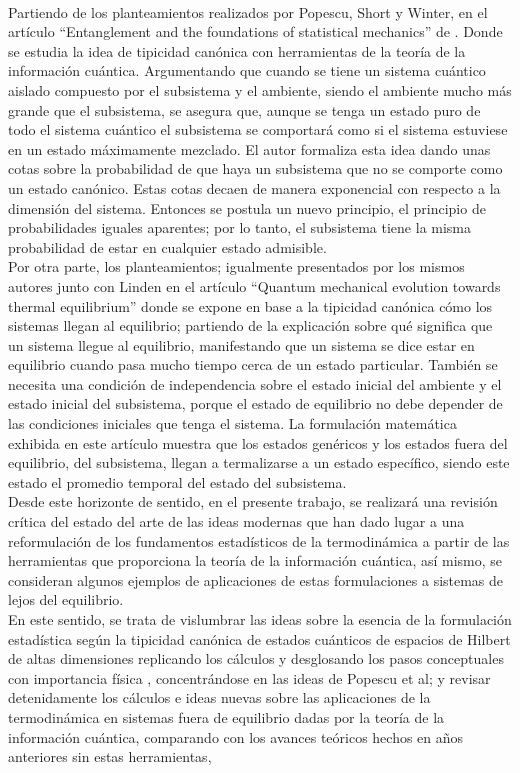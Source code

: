\\
Partiendo de los planteamientos realizados por Popescu, Short y Winter, en el artículo “Entanglement and the foundations of statistical mechanics” de \cite{Popescu2006}. Donde se estudia la idea de tipicidad canónica con herramientas de la teoría de la información cuántica. Argumentando que cuando se tiene un sistema cuántico aislado compuesto por el subsistema y el ambiente, siendo el ambiente mucho más grande que el subsistema, se asegura que, aunque se tenga un estado puro de todo el sistema cuántico el subsistema se comportará como si el sistema estuviese en un estado máximamente mezclado. El autor formaliza esta idea dando unas cotas sobre la probabilidad de que haya un subsistema que no se comporte como un estado canónico. Estas cotas decaen de manera exponencial con respecto a la dimensión del sistema. Entonces se postula un nuevo principio, el principio de probabilidades iguales aparentes; por lo tanto, el subsistema tiene la misma probabilidad de estar en cualquier estado admisible. 
\\
Por otra parte, los planteamientos; igualmente presentados por los mismos autores junto con  Linden en el artículo “Quantum mechanical evolution towards thermal equilibrium” \cite{LindenPaper}  donde se expone en base a la tipicidad canónica cómo los sistemas llegan al equilibrio; partiendo de la explicación sobre qué significa que un sistema llegue al equilibrio, manifestando  que un sistema se dice estar en equilibrio cuando pasa mucho tiempo cerca de un estado particular. También se necesita una condición de independencia sobre el estado inicial del ambiente y el estado inicial del subsistema, porque el estado de equilibrio no debe depender de las condiciones iniciales que tenga el sistema.  La formulación matemática exhibida en este artículo muestra que los estados genéricos y los estados fuera del equilibrio, del subsistema, llegan a termalizarse a un estado específico, siendo este estado el promedio temporal del estado del subsistema.
\\
Desde este horizonte de sentido, en el presente trabajo, se realizará una revisión crítica del estado del arte de las ideas modernas que han dado lugar a una reformulación de los fundamentos estadísticos de la termodinámica a partir de las herramientas que proporciona la teoría de la información cuántica, así mismo, se consideran algunos ejemplos de aplicaciones de estas formulaciones a sistemas de lejos del equilibrio.
\\
En este sentido, se trata de vislumbrar las ideas sobre la esencia de la formulación estadística según la tipicidad canónica de estados cuánticos de espacios  de Hilbert  de altas dimensiones replicando los cálculos y desglosando los pasos conceptuales con importancia física , concentrándose en las ideas de Popescu et al;  y  revisar detenidamente los cálculos e ideas nuevas  sobre las aplicaciones de la termodinámica en sistemas fuera de equilibrio dadas por la teoría de la información cuántica, comparando con los avances teóricos  hechos en años anteriores  sin estas herramientas,
